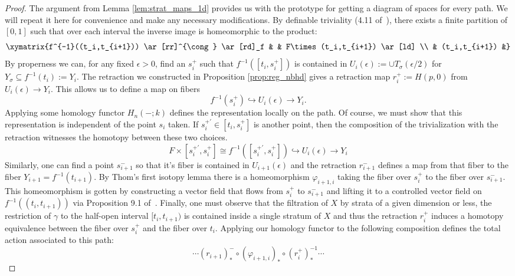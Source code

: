 \begin{proof}
	The argument from Lemma \ref{lem:strat_maps_1d} provides us with the prototype for getting a diagram of spaces for every path. We will repeat it here for convenience and make any necessary modifications. By definable triviality (4.11 of~\cite{vdd-geocat}), there exists a finite partition of $[0,1]$ such that over each interval the inverse image is homeomorphic to the product:
	\[
		\xymatrix{f^{-1}((t_i,t_{i+1})) \ar[rr]^{\cong} \ar[rd]_f & & F\times (t_i,t_{i+1}) \ar[ld] \\ & (t_i,t_{i+1}) &}
	\]
	By properness we can, for any fixed $\epsilon>0$, find an $s_i^+$ such that $f^{-1}([t_i,s_i^+])$ is contained in $U_{i}(\epsilon):=\cup T_{\sigma}(\epsilon/2)$ for $Y_{\sigma}\subseteq f^{-1}(t_{i}):=Y_{i}$. The retraction we constructed in Proposition \ref{prop:reg_nbhd} gives a retraction map $r_i^+:=H(p,0)$ from $U_{i}(\epsilon)\to Y_{i}$. This allows us to define a map on fibers
	\[
		f^{-1}(s_i^+) \hookrightarrow U_{i}(\epsilon) \to Y_{i}.
	\]
	Applying some homology functor $H_n(-;k)$ defines the representation locally on the path. Of course, we must show that this representation is independent of the point $s_i$ taken. If $s_i^{+'}\in [t_{i},s_i^+]$ is another point, then the composition of the trivialization with the retraction witnesses the homotopy between these two choices.
	\[
	 F\times [s_i^{+'},s_i^+]\cong f^{-1}([s_i^{+'},s_i^{+}])\hookrightarrow U_{i}(\epsilon) \to Y_{i}
	\]
	Similarly, one can find a point $s_{i+1}^-$ so that it's fiber is contained in $U_{i+1}(\epsilon)$ and the retraction $r_{i+1}^-$ defines a map from that fiber to the fiber $Y_{i+1}=f^{-1}(t_{i+1})$. 
By Thom's first isotopy lemma there is a homeomorphism $\varphi_{i+1,i}$ taking the fiber over $s_{i}^+$ to the fiber over $s_{i+1}^-$. This homeomorphism is gotten by constructing a vector field that flows from $s_i^+$ to $s_{i+1}^-$ and lifting it to a controlled vector field on $f^{-1}((t_i,t_{i+1}))$ via Proposition 9.1 of~\cite{mather}. 
	Finally, one must observe that the filtration of $X$ by strata of a given dimension or less, the restriction of $\gamma$ to the half-open interval $[t_i,t_{i+1})$ is contained inside a single stratum of $X$ and thus the retraction $r_i^+$ induces a homotopy equivalence between the fiber over $s_i^+$ and the fiber over $t_i$. Applying our homology functor to the following composition defines the total action associated to this path:
	\[
		\cdots (r_{i+1})_*^-\circ (\varphi_{i+1,i})_* \circ (r_{i}^+)_*^{-1} \cdots
	\]


\end{proof}
